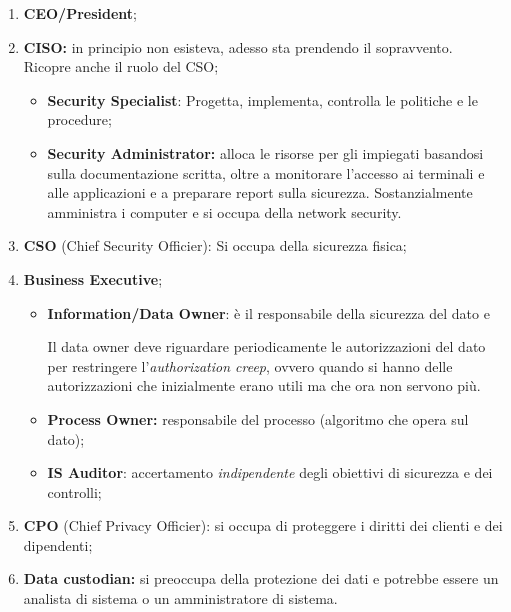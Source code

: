 \begin{enumerate}
  \item \textbf{CEO/President};
  \item \textbf{CISO:} in principio non esisteva, adesso sta prendendo il 
  sopravvento. Ricopre anche il ruolo del CSO;
  \begin{itemize}
        \item \textbf{Security Specialist}: Progetta, implementa, 
        controlla le politiche e le procedure;
        \item \textbf{Security Administrator:} alloca le risorse per gli 
        impiegati basandosi sulla documentazione scritta, oltre a monitorare 
        l'accesso ai terminali e alle applicazioni e a preparare report sulla 
        sicurezza. Sostanzialmente amministra i computer e si occupa
        della network security.
  \end{itemize}
  \item \textbf{CSO} (Chief Security Officier): Si occupa della 
  sicurezza fisica;
  \item \textbf{Business Executive};
  \begin{itemize}
  \item \textbf{Information/Data Owner}: 
  è il responsabile della sicurezza del dato e 
  
  
  Il data owner deve riguardare periodicamente le autorizzazioni del dato
  per restringere l'\textit{authorization creep}, ovvero quando si hanno
  delle autorizzazioni che inizialmente erano utili ma che ora non servono più.
  \item \textbf{Process Owner:} responsabile del processo (algoritmo che opera 
  sul dato);
  \item \textbf{IS Auditor}: accertamento \emph{indipendente} degli 
  obiettivi di sicurezza e dei controlli;
  \end{itemize}
  \item \textbf{CPO} (Chief Privacy Officier): si occupa di proteggere
  i diritti dei clienti e dei dipendenti;
  \item \textbf{Data custodian:} si preoccupa della protezione dei dati e 
  potrebbe essere un analista di sistema o un amministratore di sistema.
\end{enumerate}

